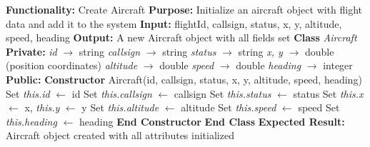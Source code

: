 \documentclass[a4paper,11pt]{article}
\begin{document}
\begin{algorithm}
\caption{Create Aircraft (C++ OOP Style)}
\begin{algorithmic}[1]
\State \textbf{Functionality:} Create Aircraft
\State \textbf{Purpose:} Initialize an aircraft object with flight data and add it to the system
\State \textbf{Input:} flightId, callsign, status, x, y, altitude, speed, heading
\State \textbf{Output:} A new Aircraft object with all fields set
\vspace{0.3cm}
\State \textbf{Class} \textit{Aircraft}
\State \hspace{0.5cm} \textbf{Private:}
\State \hspace{1cm} \textit{id} $\rightarrow$ string
\State \hspace{1cm} \textit{callsign} $\rightarrow$ string
\State \hspace{1cm} \textit{status} $\rightarrow$ string
\State \hspace{1cm} \textit{x, y} $\rightarrow$ double (position coordinates)
\State \hspace{1cm} \textit{altitude} $\rightarrow$ double
\State \hspace{1cm} \textit{speed} $\rightarrow$ double
\State \hspace{1cm} \textit{heading} $\rightarrow$ integer
\State \hspace{0.5cm} \textbf{Public:}
\State \hspace{1cm} \textbf{Constructor} Aircraft(id, callsign, status, x, y, altitude, speed, heading)
\State \hspace{1.5cm} Set \textit{this.id} $\leftarrow$ id
\State \hspace{1.5cm} Set \textit{this.callsign} $\leftarrow$ callsign
\State \hspace{1.5cm} Set \textit{this.status} $\leftarrow$ status
\State \hspace{1.5cm} Set \textit{this.x} $\leftarrow$ x, \textit{this.y} $\leftarrow$ y
\State \hspace{1.5cm} Set \textit{this.altitude} $\leftarrow$ altitude
\State \hspace{1.5cm} Set \textit{this.speed} $\leftarrow$ speed
\State \hspace{1.5cm} Set \textit{this.heading} $\leftarrow$ heading
\State \hspace{1cm} \textbf{End Constructor}
\State \textbf{End Class}
\State \textbf{Expected Result:} Aircraft object created with all attributes initialized
\end{algorithmic}
\end{algorithm}
\end{document}
